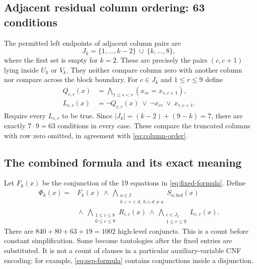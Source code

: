 \documentclass[11pt]{article}
\theoremstyle{definition}
\theoremstyle{remark}
\newcommand{\I}{I}
\begin{document}
\subsection{Adjacent residual column ordering: 63 conditions}
The permitted left endpoints of adjacent column pairs are
\begin{equation}
\label{eq:J}
 J_k=\{1,\ldots,k-2\}\ \cup\ \{k,\ldots,8\},
\end{equation}
where the first set is empty for $k=2$. These are precisely the pairs
$(c,c+1)$ lying inside $U_k$ or $V_k$. They neither compare column zero
with another column nor compare across the block boundary. For
$c\in J_k$ and $1\leq r\leq9$ define
\begin{align}
 Q_{c,r}(x)&=\bigwedge_{1\leq s<r}(x_{sc}=x_{s,c+1}),\nonumber\\
\label{eq:column-formula}
 L_{c,r}(x)&=\neg Q_{c,r}(x)\ \vee\ \neg x_{rc}\ \vee\ x_{r,c+1}.
\end{align}
Require every $L_{c,r}$ to be true. Since
$|J_k|=(k-2)+(9-k)=7$, there are exactly $7\cdot9=63$
conditions in every case. These compare the truncated columns with
row zero omitted, in agreement with \eqref{eq:column-order}.

\subsection{The combined formula and its exact meaning}
Let $F_k(x)$ be the conjunction of the 19 equations in
\eqref{eq:fixed-formula}. Define
\begin{equation}
\label{eq:Phi}
 \begin{aligned}
 \Phi_k(x)={}&F_k(x)\ \wedge\
 \bigwedge_{\substack{a\in\I\\ b<c<d,\ b,c,d\ne a}}S_{a;bcd}(x)\\
 &{}\wedge\ \bigwedge_{\substack{1\leq i\leq8\\0\leq c\leq9}}R_{i,c}(x)
 \ \wedge\ \bigwedge_{\substack{c\in J_k\\1\leq r\leq9}}L_{c,r}(x).
 \end{aligned}
\end{equation}
There are $840+80+63+19=1002$ high-level conjuncts. This is a count
before constant simplification. Some become tautologies after the
fixed entries are substituted. It is not a count of clauses in a
particular auxiliary-variable CNF encoding: for example,
\eqref{eq:sep-formula} contains conjunctions inside a disjunction.
\end{document}
